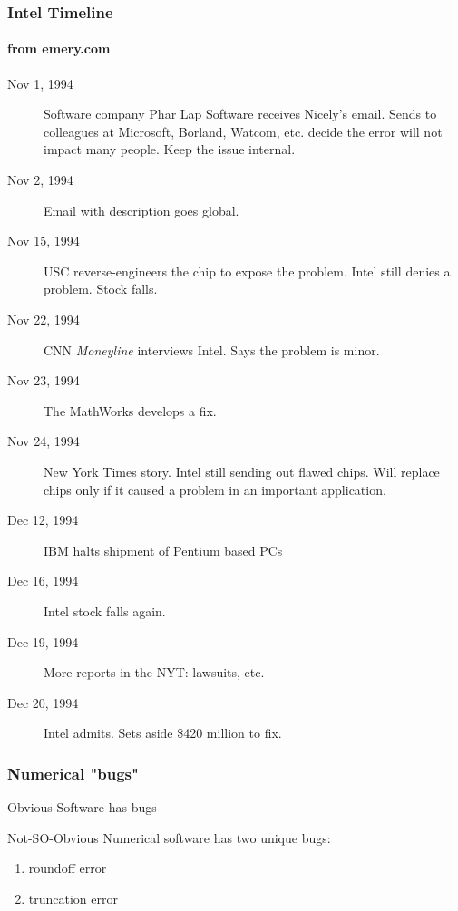 \documentclass[10pt]{beamer}
\begin{document}
\begin{frame}
\frametitle{Intel Timeline}
\framesubtitle{from emery.com}
\begin{description}
\item[Nov 1, 1994]  Software company Phar Lap Software receives Nicely's
email.  Sends to colleagues at Microsoft, Borland, Watcom, etc.
decide the error will not impact many people.  Keep the issue internal.
\item[Nov 2, 1994]  Email with description goes global.
\item[Nov 15, 1994] USC reverse-engineers the chip to expose the problem.
Intel still denies a problem.  Stock falls.
\item[Nov 22, 1994] CNN \emph{Moneyline} interviews Intel.  Says the problem
is minor.
\item[Nov 23, 1994] The MathWorks develops a fix.
\item[Nov 24, 1994] New York Times story.  Intel still sending out flawed
chips.  Will replace chips only if it caused a problem in an important
application.
\item[Dec 12, 1994] IBM halts shipment of Pentium based PCs
\item[Dec 16, 1994] Intel stock falls again.
\item[Dec 19, 1994] More reports in the NYT: lawsuits, etc.
\item[Dec 20, 1994] Intel admits.  Sets aside \$420 million to fix.
\end{description}
\end{frame}
\begin{frame}
\frametitle{Numerical "bugs"}
\begin{alertblock}{Obvious}
Software has bugs
\end{alertblock}

\vspace{1.0cm}
\begin{alertblock}{Not-SO-Obvious}
Numerical software has two unique bugs:
\begin{enumerate}
  \item roundoff error
  \item truncation error
\end{enumerate}
\end{alertblock}
\end{frame}
\end{document}

